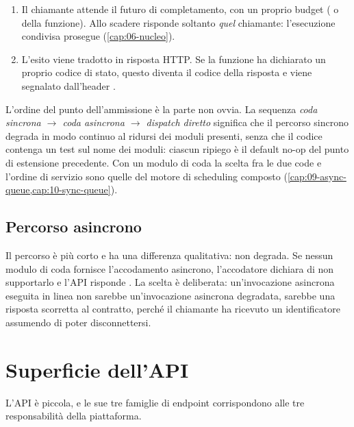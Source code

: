 \begin{enumerate}[leftmargin=*]
  \item Il chiamante attende il futuro di completamento, con un proprio budget
  ( o  della funzione). Allo scadere risponde
   soltanto \emph{quel} chiamante: l'esecuzione condivisa prosegue
  (\cref{cap:06-nucleo}).

  \item L'esito viene tradotto in risposta HTTP. Se la funzione ha dichiarato un
  proprio codice di stato, questo diventa il codice della risposta e viene
  segnalato dall'header .
\end{enumerate}

L'ordine del punto dell'ammissione \`e la parte non ovvia. La sequenza \emph{coda sincrona
$\to$ coda asincrona $\to$ dispatch diretto} significa che il percorso sincrono
degrada in modo continuo al ridursi dei moduli presenti, senza che il codice
contenga un test sul nome dei moduli: ciascun ripiego \`e il default no-op del
punto di estensione precedente. Con un modulo di coda la scelta fra le due code
e l'ordine di servizio sono quelle del motore di scheduling composto
(\cref{cap:09-async-queue,cap:10-sync-queue}).

\subsection{Percorso asincrono}

Il percorso  \`e pi\`u corto e ha una differenza qualitativa: non
degrada. Se nessun modulo di coda fornisce l'accodamento asincrono, l'accodatore dichiara
di non supportarlo e l'API risponde . La scelta
\`e deliberata: un'invocazione asincrona eseguita in linea non sarebbe
un'invocazione asincrona degradata, sarebbe una risposta scorretta al contratto,
perch\'e il chiamante ha ricevuto un identificatore assumendo di poter
disconnettersi.

\section{Superficie dell'API}

L'API \`e piccola, e le sue tre famiglie di endpoint corrispondono alle tre
responsabilit\`a della piattaforma.

